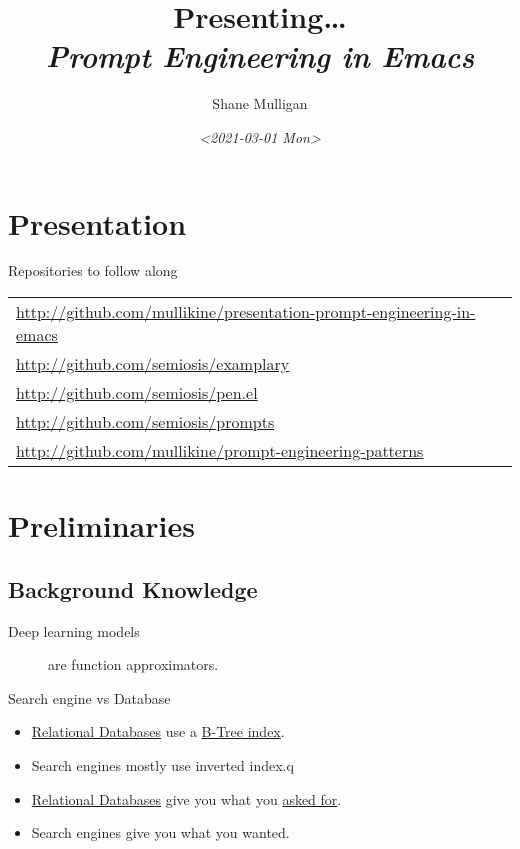 \documentclass[presentation]{beamer}
\author{Shane Mulligan \\  }
\date{\textit{<2021-03-01 Mon>}}
\title{Presenting\ldots{} \\   \emph{\alert{Prompt Engineering in Emacs}} \\  }
\begin{document}
\maketitle

\section{Presentation}
\label{sec:orgf43bf36}
\begin{frame}[label={sec:orgc5f8958}]{Repositories to follow along}
\begin{center}
\begin{tabular}{l}
\url{http://github.com/mullikine/presentation-prompt-engineering-in-emacs}\\
\url{http://github.com/semiosis/examplary}\\
\url{http://github.com/semiosis/pen.el}\\
\url{http://github.com/semiosis/prompts}\\
\url{http://github.com/mullikine/prompt-engineering-patterns}\\
\end{tabular}
\end{center}
\end{frame}

\section{Preliminaries}
\label{sec:org136e6df}
\subsection{Background Knowledge}
\label{sec:org39990da}
\begin{description}
\item[{Deep learning models}] are function approximators.
\end{description}

\begin{frame}[label={sec:org1eda66b}]{Search engine vs Database}
\begin{itemize}
\item \uline{Relational Databases} use a \uline{B-Tree index}.
\item \alert{Search engines} mostly use \alert{inverted index}.q
\item \uline{Relational Databases} give you what you \uline{asked for}.
\item \alert{Search engines} give you what you \alert{wanted}.
\end{itemize}
\end{frame}
\end{document}

